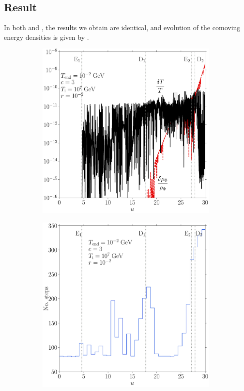 \documentclass[11pt,a4paper]{article}
\begin{document}
\subsection{Result} 
%
In both \CPP and \PY, the results we obtain are identical, and evolution of the comoving energy densities is given by . 
%
\begin{figure}[t]
	\begin{subfigure}{0.5\textwidth}
		\includegraphics[width=1\textwidth]{figs/EMD_err.pdf}
		\caption{}
		\label{fig:EMD_err}
	\end{subfigure}
	\begin{subfigure}{0.5\textwidth}
		\includegraphics[width=1\textwidth]{figs/EMD_hist.pdf}

\end{subfigure}
\end{figure}
\end{document}
